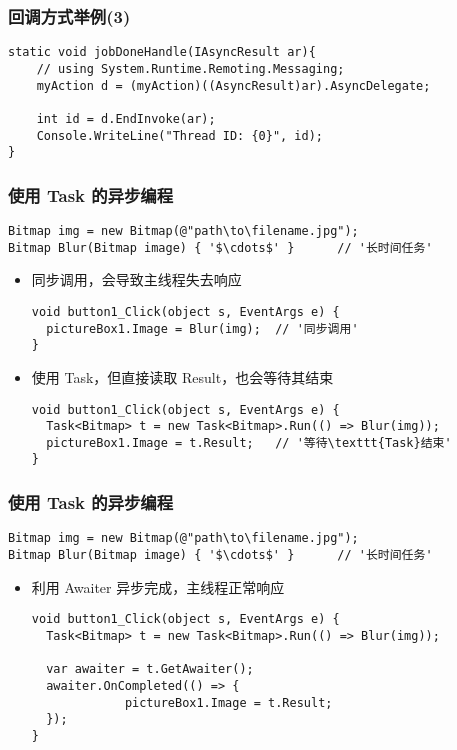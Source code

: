 \begin{frame}[fragile]
\frametitle{回调方式举例(3)}
\begin{lstlisting}
static void jobDoneHandle(IAsyncResult ar){
    // using System.Runtime.Remoting.Messaging;
    myAction d = (myAction)((AsyncResult)ar).AsyncDelegate;

    int id = d.EndInvoke(ar);
    Console.WriteLine("Thread ID: {0}", id);
}
\end{lstlisting}
\end{frame}


\begin{frame}[fragile,t]
\frametitle{使用 Task 的异步编程}
\begin{lstlisting}[escapeinside='']
Bitmap img = new Bitmap(@"path\to\filename.jpg");
Bitmap Blur(Bitmap image) { '$\cdots$' }      // '长时间任务'
\end{lstlisting}
\begin{itemize}
\item 同步调用，会导致主线程失去响应
\begin{lstlisting}[escapeinside='']
void button1_Click(object s, EventArgs e) {
  pictureBox1.Image = Blur(img);  // '同步调用'
}
\end{lstlisting}
\item 使用 Task，但直接读取 Result，也会等待其结束
\begin{lstlisting}[escapeinside='']
void button1_Click(object s, EventArgs e) {
  Task<Bitmap> t = new Task<Bitmap>.Run(() => Blur(img));
  pictureBox1.Image = t.Result;   // '等待\texttt{Task}结束'
}
\end{lstlisting}
\end{itemize}
\end{frame}

\begin{frame}[fragile,t]
\frametitle{使用 Task 的异步编程}
\begin{lstlisting}[escapeinside='']
Bitmap img = new Bitmap(@"path\to\filename.jpg");
Bitmap Blur(Bitmap image) { '$\cdots$' }      // '长时间任务'
\end{lstlisting}
\begin{itemize}
\item 利用 Awaiter 异步完成，主线程正常响应
\begin{lstlisting}[escapeinside='']
void button1_Click(object s, EventArgs e) {
  Task<Bitmap> t = new Task<Bitmap>.Run(() => Blur(img));

  var awaiter = t.GetAwaiter();
  awaiter.OnCompleted(() => { 
             pictureBox1.Image = t.Result; 
  });
}
\end{lstlisting}
\end{itemize}
\end{frame}



